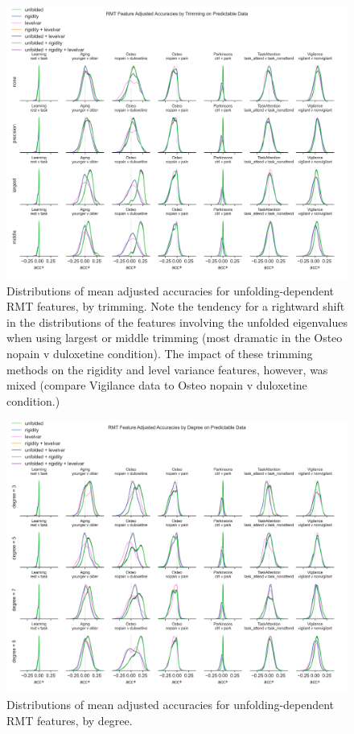 \documentclass{article}  %
\begin{document}
\begin{figure}[H]
\begin{center}
\includegraphics[width=\textwidth,height=0.9\textheight,keepaspectratio]{rmt_feature_accs_by_trim.png}
\end{center}
\caption
{ \label{fig:fine-trim-acc} Distributions of mean adjusted accuracies for
unfolding-dependent RMT features, by trimming. Note the tendency for a
rightward shift in the distributions of the features involving the
unfolded eigenvalues when using largest or middle trimming (most dramatic in
the Osteo nopain v duloxetine condition). The impact of these trimming methods
on the rigidity and level variance features, however, was mixed (compare
Vigilance data to Osteo nopain v duloxetine condition.)}
\end{figure}



\begin{figure}[H]
\begin{center}
\includegraphics[width=\textwidth,height=0.9\textheight,keepaspectratio]{rmt_feature_accs_by_degree.png}
\end{center}
\caption
{ \label{fig:fine-degree-acc}
Distributions of mean adjusted accuracies for unfolding-dependent RMT features, by degree.}
\end{figure}
\end{document}
